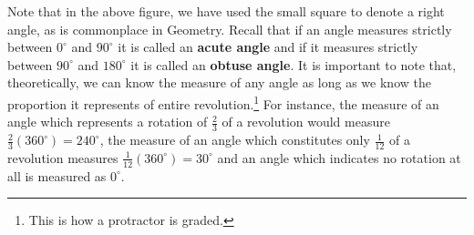 \documentclass{ximera}
\begin{document}
Note that in the above figure,  we have used the small square to denote a right angle, as is commonplace in Geometry.  Recall that if an angle measures strictly between $0^{\circ}$ and $90^{\circ}$ it is called an \textbf{acute angle} and if it measures strictly between $90^{\circ}$ and $180^{\circ}$ it is called an \textbf{obtuse angle}. It is important to note that, theoretically, we can know the measure of any angle as long as we know the proportion it represents of entire revolution.\footnote{This is how a protractor is graded.}  For instance, the measure of an angle which represents a rotation of $\frac{2}{3}$ of a revolution would measure $\frac{2}{3} \left(360^{\circ}\right) = 240^{\circ}$,  the measure of an angle which constitutes only $\frac{1}{12}$ of a revolution measures $\frac{1}{12} \left(360^{\circ}\right) = 30^{\circ}$ and an angle which indicates no rotation at all is measured as $0^{\circ}$.
\end{document}
